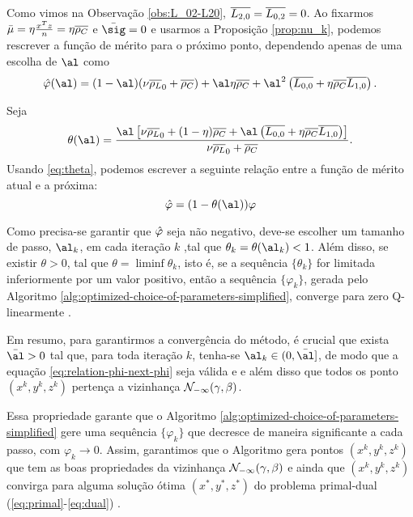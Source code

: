 Como vimos na Observação \ref{obs:L_02-L20},  $\overline{L_{2,0}} = \overline{L_{0,2}} = 0$. Ao fixarmos $\bar{\mu} = \eta\frac{x^Tz}{n} = \eta\overline{\rho_C} $
 e $\bar{\sig}=0$ e usarmos a Proposição \ref{prop:nu_k},   podemos rescrever a função de mérito para o próximo ponto, dependendo apenas de uma escolha de  $\al$ como
\begin{equation}
	\label{eq:simplified-merit-function-al}
\nextphi(\al)  = (1-\al)(\nu\dbvec{\rho_L}_0 +
\dbvec{\rho_C}) + \al\eta\dbvec{\rho_C} + \al^2\left(\dbvec{L_{0,0}} + \eta\dbvec{\rho_C} \dbvec{L_{1,0}}
\right) .
\end{equation}

Seja 
\begin{equation}
	\label{eq:theta}
\theta(\al) =  \dfrac{\al\left[ \nu\dbvec{\rho_L}_0 + (1-\eta)\dbvec{\rho_C} + \al\left(\dbvec{L_{0,0}} + \eta\dbvec{\rho_C} \dbvec{L_{1,0}}
\right) \right]}{\nu\dbvec{\rho_L}_0 +
\dbvec{\rho_C}}.
\end{equation}
Usando \eqref{eq:theta}, podemos escrever a seguinte relação entre a função de mérito atual e a próxima:
\begin{equation}
	\label{eq:relation-phi-next-phi}
	 			{\nextphi} = (1- \theta(\al))\varphi
\end{equation}

Como precisa-se garantir que  $\hat{\varphi}  $  seja não negativo, deve-se escolher um tamanho de passo,  $\al_k$, em cada iteração $k$ ,tal que  $\theta_k = \theta(\al_k)<1$. Além disso, se existir $\theta>0$, tal que $\theta = \liminf \theta_k$, isto é, se a sequência $\{\theta_k\}$ for limitada inferiormente por um valor positivo, então a sequência $\{\varphi_k\}$, gerada pelo Algoritmo \ref{alg:optimized-choice-of-parameters-simplified}, converge para zero Q-linearmente \cite{Ortega:2000vd}.






 Em resumo, para garantirmos a convergência do método, é crucial que exista $\bar{\al}>0$  tal que,  para toda iteração $k$, tenha-se  $\al_k\in(0,\bar{\al}]$, de modo que a equação \eqref{eq:relation-phi-next-phi} seja válida e  e além disso que todos os  ponto  $({x}^{k} ,{y}^{k},{z}^{k})$ pertença a vizinhança $\mathcal{N}_{-\infty}(\gamma,\beta)$.

 Essa propriedade garante que  o Algoritmo \ref{alg:optimized-choice-of-parameters-simplified} gere uma sequência $\{\varphi_k\}$ que decresce de maneira significante a cada passo, com $\varphi_k \to 0$. Assim, garantimos que o Algoritmo gera pontos $({x}^{k} ,{y}^{k},{z}^{k})$ que tem as boas propriedades da vizinhança $\mathcal{N}_{-\infty}(\gamma,\beta)$ e ainda que $({x}^{k} ,{y}^{k},{z}^{k})$ convirga para  alguma solução ótima $({x}^{*} ,{y}^{*},{z}^{*})$ do problema primal-dual  (\ref{eq:primal}-\ref{eq:dual}) .



